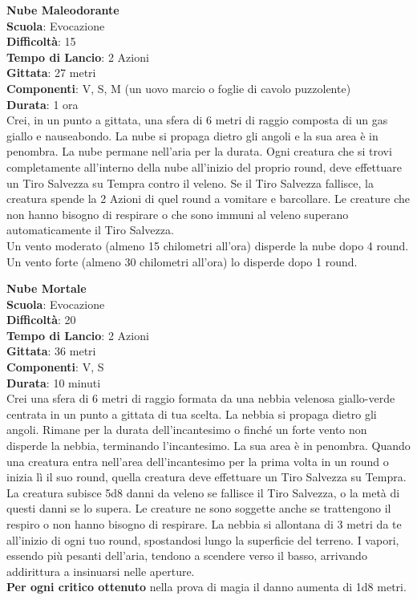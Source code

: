 \begin{multicols}{2}
\medskip\textbf{Nube Maleodorante}\\
\textbf{Scuola}: Evocazione\\
\textbf{Difficoltà}:  15\\
\textbf{Tempo di Lancio}: 2 Azioni\\
\textbf{Gittata}: 27 metri\\
\textbf{Componenti}: V, S, M (un uovo marcio o foglie di cavolo puzzolente)\\
\textbf{Durata}: 1 ora\\
Crei, in un punto a gittata, una sfera di 6 metri di raggio composta di un gas giallo e nauseabondo. La nube si propaga dietro gli angoli e la sua area è in penombra. La nube permane nell'aria per la durata. Ogni creatura che si trovi completamente all'interno della nube all'inizio del proprio round, deve effettuare un Tiro Salvezza su Tempra contro il veleno. Se il Tiro Salvezza fallisce, la creatura spende la 2 Azioni di quel round a vomitare e barcollare. Le creature che non hanno bisogno di respirare o che sono immuni al veleno superano automaticamente il Tiro Salvezza.\\
Un vento moderato (almeno 15 chilometri all'ora) disperde la nube dopo 4 round. Un vento forte (almeno 30 chilometri all'ora) lo disperde dopo 1 round.

\medskip\textbf{Nube Mortale}\\
\textbf{Scuola}: Evocazione\\
\textbf{Difficoltà}:  20\\
\textbf{Tempo di Lancio}: 2 Azioni\\
\textbf{Gittata}: 36 metri\\
\textbf{Componenti}: V, S\\
\textbf{Durata}: 10 minuti \\
Crei una sfera di 6 metri di raggio formata da una  nebbia velenosa giallo-verde centrata in un punto a gittata di tua scelta. La nebbia si propaga dietro gli angoli. Rimane per la durata dell'incantesimo o finché un forte vento non disperde la nebbia, terminando l'incantesimo. La sua area è in penombra. Quando una creatura entra nell'area dell'incantesimo per la prima volta in un round o inizia lì il suo round, quella creatura deve effettuare un Tiro Salvezza su Tempra. La creatura subisce 5d8 danni da veleno se fallisce il Tiro Salvezza, o la metà di questi danni se lo supera. Le creature ne sono soggette anche se trattengono il respiro o non hanno bisogno di respirare. La nebbia si allontana di 3 metri da te all'inizio di ogni tuo round, spostandosi lungo la superficie del terreno. I vapori, essendo più pesanti dell'aria, tendono a
scendere verso il basso, arrivando addirittura a insinuarsi nelle aperture.\\
\textbf{Per ogni critico ottenuto} nella prova di magia il danno aumenta di 1d8 metri.


\end{multicols}
